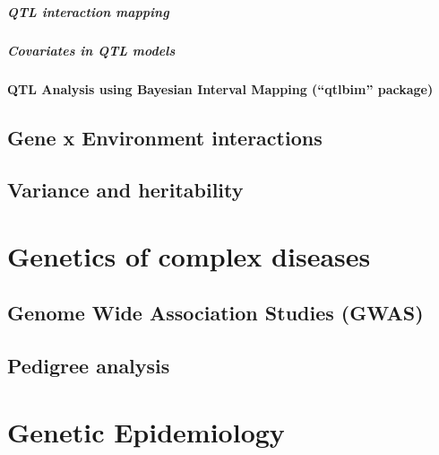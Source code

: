 \documentclass[12pt,]{krantz}
\let\oldparagraph\paragraph
\renewcommand{\paragraph}[1]{\oldparagraph{#1}\mbox{}}
\begin{document}
\paragraph{QTL interaction mapping}\label{qtl-interaction-mapping}

\paragraph{Covariates in QTL models}\label{covariates-in-qtl-models}

\subsubsection{\texorpdfstring{QTL Analysis using Bayesian Interval
Mapping (``qtlbim''
package)}{QTL Analysis using Bayesian Interval Mapping (qtlbim package)}}\label{qtl-analysis-using-bayesian-interval-mapping-qtlbim-package}

\section{Gene x Environment
interactions}\label{gene-x-environment-interactions}

\section{Variance and heritability}\label{variance-and-heritability}

\chapter{Genetics of complex
diseases}\label{genetics-of-complex-diseases}

\section{Genome Wide Association Studies
(GWAS)}\label{genome-wide-association-studies-gwas}

\section{Pedigree analysis}\label{pedigree-analysis}

\chapter{Genetic Epidemiology}\label{genetic-epidemiology}
\end{document}
